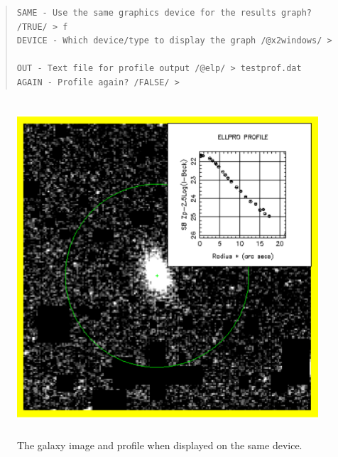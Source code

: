 \documentclass[twoside,11pt]{article}
\newenvironment{latexonly}{}{}
\newenvironment{myquote}{\begin{quote}\begin{small}}{\end{small}\end{quote}}
\begin{document}
\begin{myquote}
\begin{verbatim}
SAME - Use the same graphics device for the results graph? /TRUE/ > f
DEVICE - Which device/type to display the graph /@x2windows/ >

OUT - Text file for profile output /@elp/ > testprof.dat
AGAIN - Profile again? /FALSE/ >
\end{verbatim}
\end{myquote}

\begin{latexonly}
\begin{figure}[htlb]
\centering
\includegraphics[height=125mm,width=125mm]{sun180_diag3}
\caption{The galaxy image and profile when displayed on the same device.}
\end{figure}
\end{latexonly}
\end{document}
